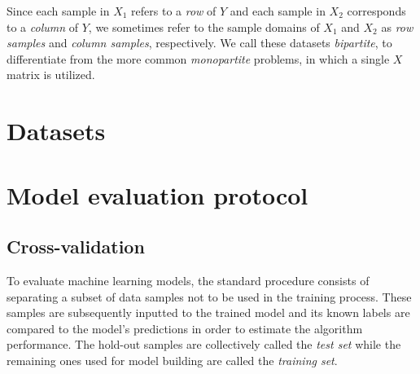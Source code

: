 Since each sample in $X_1$ refers to a \emph{row} of $Y$ and each sample in
$X_2$ corresponds to a \emph{column} of $Y$, we sometimes refer to the sample
domains of $X_1$ and $X_2$ as \emph{row samples} and \emph{column samples},
respectively. We call these datasets \emph{bipartite}, to differentiate from the
more common \emph{monopartite} problems, in which a single $X$ matrix is
utilized.





\section{Datasets}
\label{sec:datasets}

\section{Model evaluation protocol}
\label{sec:evaluation_protocol}


\subsection{Cross-validation}
\label{sec:cross_validation}

To evaluate machine learning models, the standard procedure consists of separating a subset of data samples not to be used in the training process. These samples are subsequently inputted to the trained model and its known labels are compared to the model's predictions in order to estimate the algorithm performance. The hold-out samples are collectively called the \emph{test set} while the remaining ones used for model building are called the \emph{training set}.

